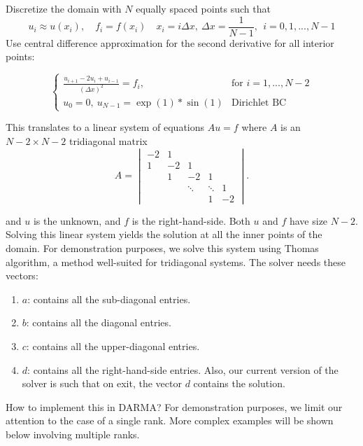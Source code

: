 Discretize the domain with $N$ equally spaced points such that 
\begin{equation}
u_i \approx u(x_i), \quad f_i=f(x_i) 
\quad x_i = i \Delta x, \ \Delta x=\frac{1}{N-1}, \ \ i=0,1,...,N-1
\end{equation}
Use central difference approximation for the second derivative 
for all interior points:
\begin{large}
\begin{equation}
\begin{cases}
  \frac{u_{i+1} - 2u_i + u_{i-1}}{(\Delta x)^2}=f_i, & \text{for } i=1,...,N-2 \\
    u_0=0, \ u_{N-1}=\exp{(1)}*\sin{(1)} & \text{Dirichlet BC}
\end{cases}  
\end{equation}
\end{large}

This translates to a linear system of equations $Au=f$ 
where $A$ is an $N-2 \times N-2$ tridiagonal matrix 
\begin{equation}
A = \begin{vmatrix}
-2 & 1 \\
1 & -2 & 1 \\
& 1 & -2 & 1 \\
& & \ddots & \ddots & 1 \\
& & & 1 & -2
\end{vmatrix}.
\end{equation}

and $u$ is the unknown, and $f$ is the right-hand-side. 
Both $u$ and $f$ have size $N-2$. 
Solving this linear system yields the solution at all the inner 
points of the domain. For demonstration purposes, we solve 
this system using Thomas algorithm, a method well-suited 
for tridiagonal systems. 
The solver needs these vectors:
\begin{enumerate}
\item $a$: contains all the sub-diagonal entries. 
\item $b$: contains all the diagonal entries. 
\item $c$: contains all the upper-diagonal entries. 
\item $d$: contains all the right-hand-side entries. 
Also, our current version of the solver is 
such that on exit, the vector $d$ contains the solution.
\end{enumerate}

How to implement this in DARMA? 
For demonstration purposes, we limit our attention to the case 
of a single rank. More complex examples will be shown below 
involving multiple ranks.

